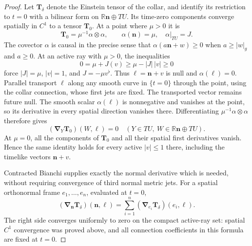 \begin{proof}
Let $\mathbf T_\delta$ denote the Einstein tensor of the collar, and
identify its restriction to $t=0$ with a bilinear form on
$\mathbb R\mathbf n\oplus TU$.  Its time-zero components converge
spatially in $C^1$ to a tensor $\mathbf T_0$.
At a point where $\mu>0$ it is
\[
 \mathbf T_0=\mu^{-1}\alpha\otimes\alpha,
 \qquad \alpha(\mathbf n)=\mu,\quad \alpha|_{TU}=J.
\]
The covector $\alpha$ is causal in the precise sense that
$\alpha(a\mathbf n+w)\geq0$ when $a\geq|w|_g$ and $a\geq0$.
At an active ray with $\mu>0$, the inequalities
\[
 0=\mu+J(v)\geq\mu-|J|\,|v|\geq0
\]
force $|J|=\mu$, $|v|=1$, and $J=-\mu v^\flat$.
Thus $\ell=\mathbf n+v$ is null and $\alpha(\ell)=0$.
Parallel transport $\ell$ along any smooth curve in $\{t=0\}$ through
the point, using the collar connection, whose first jets are fixed.
The transported vector remains future null.  The smooth scalar
$\alpha(\ell)$ is nonnegative and vanishes at the point, so its
derivative in every spatial direction vanishes there.  Differentiating
$\mu^{-1}\alpha\otimes\alpha$ therefore gives
\[
 (\boldsymbol\nabla_Y\mathbf T_0)(W,\ell)=0
 \quad (Y\in TU,\ W\in\mathbb R\mathbf n\oplus TU).
\]
At $\mu=0$, all the components of $\mathbf T_0$ and all their spatial
first derivatives vanish.  Hence the same identity holds for every
active $|v|\leq1$ there, including the timelike vectors $\mathbf n+v$.

Contracted Bianchi supplies exactly the normal derivative which is
needed, without requiring convergence of third normal metric jets.
For a spatial orthonormal frame $e_1,\ldots,e_n$, evaluated at $t=0$,
\[
 (\boldsymbol\nabla_{\mathbf n}\mathbf T_\delta)
                  (\mathbf n,\ell)
   =\sum_{i=1}^n(\boldsymbol\nabla_{e_i}\mathbf T_\delta)(e_i,\ell).
\]
The right side converges uniformly to zero on the compact active-ray
set: spatial $C^1$ convergence was proved above, and all connection
coefficients in this formula are fixed at $t=0$.


\end{proof}
